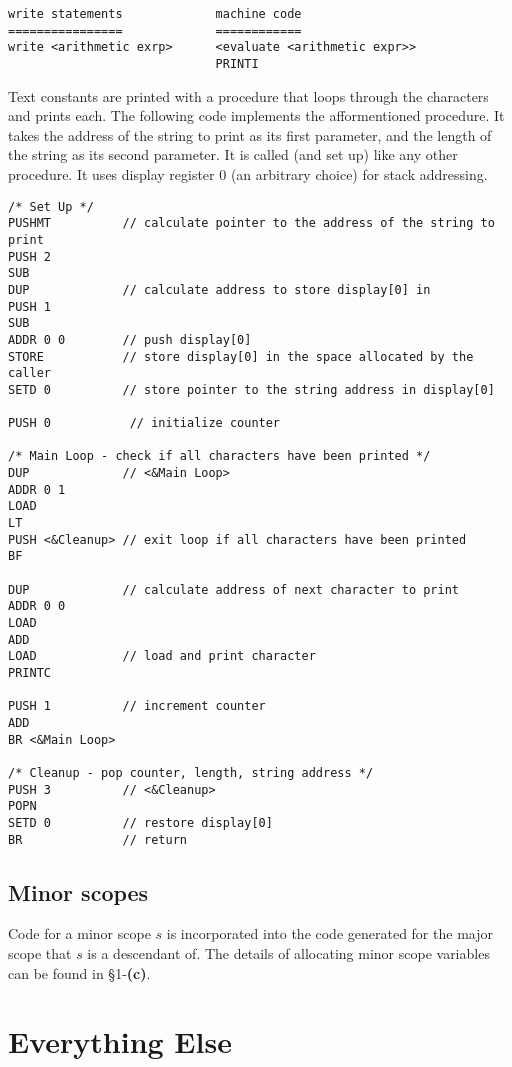 \documentclass[11pt]{article}
\begin{document}
\begin{verbatim}
write statements             machine code
================             ============
write <arithmetic exrp>      <evaluate <arithmetic expr>>   
                             PRINTI
\end{verbatim}

Text constants are printed with a procedure that loops through the characters and prints each. The following code implements the afformentioned procedure. It takes the address of the string to print as its first parameter, and the length of the string as its second parameter. It is called (and set up) like any other procedure. It uses display register 0 (an arbitrary choice) for stack addressing.

\begin{verbatim}
/* Set Up */
PUSHMT          // calculate pointer to the address of the string to print
PUSH 2
SUB
DUP             // calculate address to store display[0] in
PUSH 1
SUB
ADDR 0 0        // push display[0]
STORE           // store display[0] in the space allocated by the caller
SETD 0          // store pointer to the string address in display[0]

PUSH 0           // initialize counter

/* Main Loop - check if all characters have been printed */
DUP             // <&Main Loop> 
ADDR 0 1
LOAD
LT
PUSH <&Cleanup> // exit loop if all characters have been printed
BF

DUP             // calculate address of next character to print
ADDR 0 0
LOAD
ADD
LOAD            // load and print character
PRINTC

PUSH 1          // increment counter
ADD
BR <&Main Loop>

/* Cleanup - pop counter, length, string address */
PUSH 3          // <&Cleanup> 
POPN
SETD 0          // restore display[0]
BR              // return
\end{verbatim}

\subsection{Minor scopes}

Code for a minor scope $s$ is incorporated into the code generated for the major scope that $s$ is a descendant of. The details of allocating minor scope variables can be found in \S 1-\textbf{(c)}.

\section{Everything Else}
\end{document}
